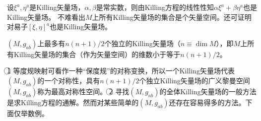 设$\xi^a, \eta^a$是Killing矢量场，$\alpha, \beta$是常实数，则由Killing方程的线性性知$\alpha\xi^a + \beta\eta^a$也是Killing矢量场。
不难看出$M$上所有Killing矢量场的集合是个矢量空间。还可证明对易子$[\xi, \eta]^a$也是Killing矢量场。

\begin{theorem}
$(M, g_{ab})$上最多有$n(n + 1) / 2$个独立的Killing矢量场（$n \equiv \dim M$），即$M$上所有Killing矢量场的集合（作为矢量空间）的维数小于等于$n(n + 1) / 2$。
\end{theorem}

\begin{note}
\textcircled{1} 等度规映射可看作一种``保度规''的对称变换，所以一个Killing矢量场代表$(M, g_{ab})$的一个对称性，具有$n(n + 1) / 2$个独立Killing矢量场的广义黎曼空间$(M, g_{ab})$称为最高对称性空间。
\textcircled{2} 寻找$(M, g_{ab})$的全体Killing矢量场的一般方法是求Killing方程的通解。然而对某些简单的$(M, g_{ab})$还存在容易得多的方法。下面仅举数例。
\end{note}

